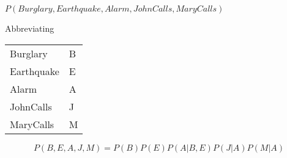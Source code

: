 \documentclass[12pt,letterpaper]{article}
\begin{document}
\begin{enumerate}
\begin{enumerate}
        $P(Burglary,Earthquake,Alarm,JohnCalls,MaryCalls)$

        Abbreviating

        \begin{tabular}{l l}
          Burglary   & B \\
          Earthquake & E \\
          Alarm      & A \\
          JohnCalls  & J \\
          MaryCalls  & M \\
        \end{tabular}
        \[
          P(B,E,A,J,M) = P(B)P(E)P(A|B,E)P(J|A)P(M|A)
        \]
      \end{enumerate}
  \end{enumerate}
\end{document}
